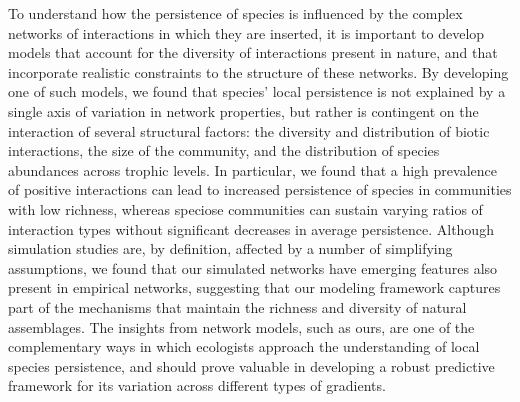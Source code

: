 To understand how the persistence of species is influenced by the complex networks of interactions in which they are inserted, it is important to develop models that account for the diversity of interactions present in nature, and that incorporate realistic constraints to the structure of these networks. By developing one of such models, we found that species' local persistence is not explained by a single axis of variation in network properties, but rather is contingent on the interaction of several structural factors: the diversity and distribution of biotic interactions, the size of the community, and the distribution of species abundances across trophic levels. In particular, we found that a high prevalence of positive interactions can lead to increased persistence of species in communities with low richness, whereas speciose communities can sustain varying ratios of interaction types without significant decreases in average persistence. Although simulation studies are, by definition, affected by a number of simplifying assumptions, we found that our simulated networks have emerging features also present in empirical networks, suggesting that our modeling framework captures part of the mechanisms that maintain the richness and diversity of natural assemblages. The insights from network models, such as ours, are one of the complementary ways in which ecologists approach the understanding of local species persistence, and should prove valuable in developing a robust predictive framework for its variation across different types of gradients.
